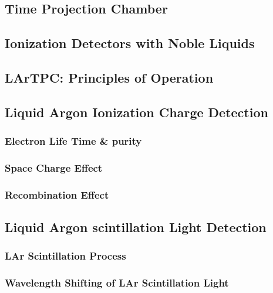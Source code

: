 \subsection{Time Projection Chamber}
\subsection{Ionization Detectors with Noble Liquids}
\subsection{LArTPC: Principles of Operation}
\subsection{Liquid Argon Ionization Charge Detection}
\subsubsection{Electron Life Time \& purity}
\subsubsection{Space Charge Effect}
\subsubsection{Recombination Effect}
\subsection{Liquid Argon scintillation Light Detection}
\subsubsection{LAr Scintillation Process}
\subsubsection{Wavelength Shifting of LAr Scintillation Light}